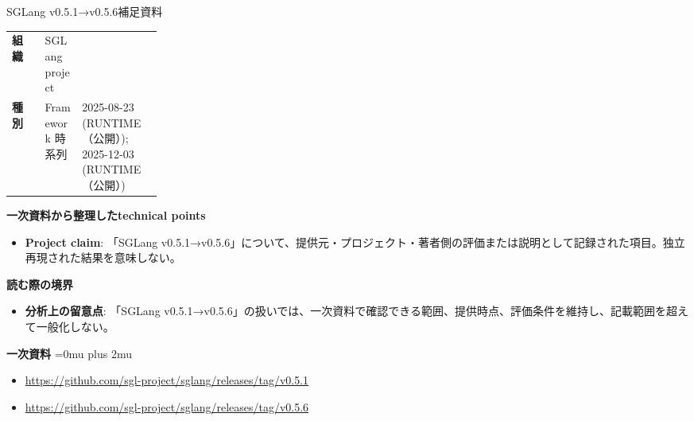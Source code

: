 \begin{technicalnote}{SGLang v0.5.1→v0.5.6}{補足資料}
\begingroup
\begin{tabularx}{\linewidth}{@{}>{\bfseries}p{0.22\linewidth}X@{}}
組織 & SGLang project \\
種別 & Framework
時系列 & 2025-08-23 (RUNTIME（公開）); 2025-12-03 (RUNTIME（公開）) \\
\end{tabularx}
\smallskip
{\bfseries 一次資料から整理したtechnical points}
\begin{itemize}[leftmargin=1.5em,itemsep=0.35em]
\item \textbf{Project claim}: 「SGLang v0.5.1→v0.5.6」について、提供元・プロジェクト・著者側の評価または説明として記録された項目。独立再現された結果を意味しない。
\end{itemize}
\begin{minipage}{\linewidth}
{\bfseries 読む際の境界}
\begin{itemize}[leftmargin=1.5em,itemsep=0.35em]
\item \textbf{分析上の留意点}: 「SGLang v0.5.1→v0.5.6」の扱いでは、一次資料で確認できる範囲、提供時点、評価条件を維持し、記載範囲を超えて一般化しない。
\end{itemize}
\begin{samepage}
{\bfseries 一次資料}
\begingroup\sloppy
\Urlmuskip=0mu plus 2mu\relax
\begin{itemize}[leftmargin=1.5em,itemsep=0.25em]
\item {\scriptsize\url{https://github.com/sgl-project/sglang/releases/tag/v0.5.1}}
\item {\scriptsize\url{https://github.com/sgl-project/sglang/releases/tag/v0.5.6}}
\end{itemize}
\endgroup
\end{samepage}
\end{minipage}
\endgroup
\end{technicalnote}
\medskip

